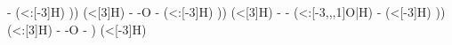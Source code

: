 \begin{struct}
{                                                                                                                            -
                                                                                                                                (<:[-3]H)
                                                                                                                        ))
                                                                                                                            (<[3]H)
                                                                                                                        -
                                                                                                                        -O
                                                                                                                        -
                                                                                                                            (<:[-3]H)
                                                                                                                    ))
                                                                                                                        (<[3]H)
                                                                                                                    -
                                                                                                                    -
                                                                                                                        (<:[-3,,,1]O|H)
                                                                                                                    -
                                                                                                                        (<[-3]H)
                                                                                                                ))
                                                                                                                    (<:[3]H)
                                                                                                                -
                                                                                                                -O
                                                                                                                -
                                                                                                            )
                                                                                                                (<[-3]H)
}
\end{struct}
